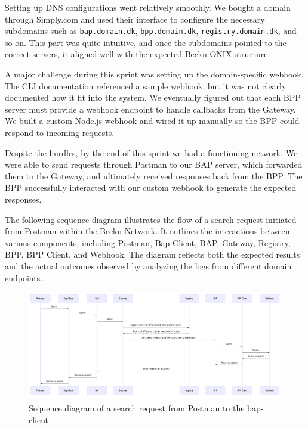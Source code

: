 Setting up DNS configurations went relatively smoothly. We bought a domain through Simply.com and used their interface to configure the necessary subdomains such as \texttt{bap.domain.dk}, \texttt{bpp.domain.dk}, \texttt{registry.domain.dk}, and so on. This part was quite intuitive, and once the subdomains pointed to the correct servers, it aligned well with the expected Beckn-ONIX structure. 

A major challenge during this sprint was setting up the domain-specific webhook. The CLI documentation referenced a sample webhook, but it was not clearly documented how it fit into the system. We eventually figured out that each BPP server must provide a webhook endpoint to handle callbacks from the Gateway. We built a custom Node.js webhook and wired it up manually so the BPP could respond to incoming requests.

Despite the hurdles, by the end of this sprint we had a functioning network. We were able to send requests through Postman to our BAP server, which forwarded them to the Gateway, and ultimately received responses back from the BPP. The BPP successfully interacted with our custom webhook to generate the expected responses.

The following sequence diagram illustrates the flow of a search request initiated from Postman within the Beckn Network. It outlines the interactions between various components, including Postman, Bap Client, BAP, Gateway, Registry, BPP, BPP Client, and Webhook. The diagram reflects both the expected results and the actual outcomes observed by analyzing the logs from different domain endpoints.\newpage

\begin{figure}[h!]
    \centering
    \includegraphics[width=1.0\textwidth]{Images/search_sequence.png}
    \caption{Sequence diagram of a search request from Postman to the bap-client}
    \label{fig:enter-label}
\end{figure}


